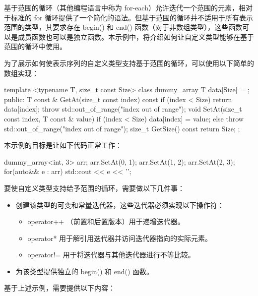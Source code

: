 
基于范围的循环（其他编程语言中称为 for-each）允许迭代一个范围的元素，相对于标准的 for 循环提供了一个简化的语法。但基于范围的循环并不适用于所有表示范围的类型，其要求存在 begin() 和 end() 函数（对于非数组类型），这些函数可以是成员函数也可以是独立函数。本示例中，将介绍如何让自定义类型能够在基于范围的循环中使用。


为了展示如何使表示序列的自定义类型支持基于范围的循环，可以使用以下简单的数组实现：

\begin{cpp}
template <typename T, size_t const Size>
class dummy_array
{
    T data[Size] = {};
    public:
    T const & GetAt(size_t const index) const
    {
        if (index < Size) return data[index];
        throw std::out_of_range("index out of range");
    }
    void SetAt(size_t const index, T const & value)
    {
        if (index < Size) data[index] = value;
        else throw std::out_of_range("index out of range");
    }
    size_t GetSize() const { return Size; }
};
\end{cpp}

本示例的目标是让如下代码正常工作：

\begin{cpp}
dummy_array<int, 3> arr;
arr.SetAt(0, 1);
arr.SetAt(1, 2);
arr.SetAt(2, 3);
for(auto&& e : arr)
{
    std::cout << e << '\n';
}
\end{cpp}


要使自定义类型支持给予范围的循环，需要做以下几件事：

\begin{itemize}
\item
创建该类型的可变和常量迭代器，这些迭代器必须实现以下操作符：

\begin{itemize}
\item
operator++ （前置和后置版本）用于递增迭代器。

\item
operator* 用于解引用迭代器并访问迭代器指向的实际元素。

\item
operator!= 用于将迭代器与其他迭代器进行不等比较。
\end{itemize}

\item
为该类型提供独立的 begin() 和 end() 函数。
\end{itemize}

基于上述示例，需要提供以下内容：

